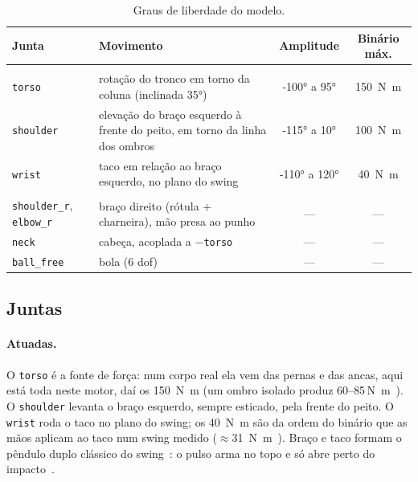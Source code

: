 \documentclass[11pt,a4paper]{article}
\begin{document}
\begin{table}[H]
\centering
\caption{Graus de liberdade do modelo.}
\label{tab:dof}
\small
\begin{tabularx}{\textwidth}{@{}lLcc@{}}
\toprule
{}
Junta & Movimento & Amplitude & Binário máx. \\
\midrule
{} \\
\texttt{torso}    & rotação do tronco em torno da coluna (inclinada \ang{35}) & \ang{-100} a \ang{95} & \SI{150}{\newton\meter} \\
\texttt{shoulder} & elevação do braço esquerdo à frente do peito, em torno da linha dos ombros & \ang{-115} a \ang{10} & \SI{100}{\newton\meter} \\
\texttt{wrist}    & taco em relação ao braço esquerdo, no plano do swing & \ang{-110} a \ang{120} & \SI{40}{\newton\meter} \\
\midrule
{} \\
\texttt{shoulder\_r}, \texttt{elbow\_r} & braço direito (rótula + charneira), mão presa ao punho & --- & --- \\
\texttt{neck}     & cabeça, acoplada a $-$\texttt{torso} & --- & --- \\
\texttt{ball\_free} & bola (6 dof) & --- & --- \\
\bottomrule
\end{tabularx}
\end{table}

\subsection{Juntas}
\label{sec:passivas}

\paragraph{Atuadas.}
O \texttt{torso} é a fonte de força: num corpo real ela vem das pernas e das
ancas, aqui está toda neste motor, daí os \SI{150}{\newton\meter} (um ombro
isolado produz 60--85\,\si{\newton\meter}~\cite{harbo2012}). O
\texttt{shoulder} levanta o braço esquerdo, sempre esticado, pela frente do
peito. O \texttt{wrist} roda o taco no plano do swing; os
\SI{40}{\newton\meter} são da ordem do binário que as mãos aplicam ao taco num
swing medido ($\approx$\SI{31}{\newton\meter}~\cite{nesbit2005}). Braço e taco
formam o pêndulo duplo clássico do swing~\cite{cochran1968,jorgensen1970}: o
pulso arma no topo e só abre perto do impacto~\cite{pickering1999}.
\end{document}
